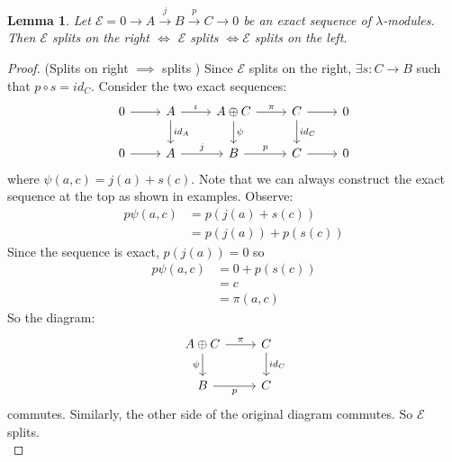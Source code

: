 \documentclass[12pt]{book}
\newtheorem{lemma}[theorem]{Lemma}
\theoremstyle{definition}
\begin{document}
\begin{lemma}
    Let $\mathcal{E} = 0 \rightarrow A \xrightarrow{j} B \xrightarrow{p} C \rightarrow 0$ be an exact sequence of $\lambda$-modules. Then $\mathcal{E}$ splits on the right $\iff$ $\mathcal{E}$ splits $\iff \mathcal{E}$ splits on the left. 
\end{lemma}
\begin{proof}
    (Splits on right $\implies$ splits )
    Since $\mathcal{E}$ splits on the right, $\exists s : C \rightarrow B$ such that $p \circ s = id_C$. Consider the two exact sequences:
        \[
        \begin{tikzcd}
        0 \arrow[r] & A \arrow[r, "\iota"] \arrow[d, "id_A"] 
        & A \oplus C \arrow[r, "\pi"] \arrow[d, "\psi"]
        & C \arrow[r] \arrow[d, "id_C"]
        & 0 \\
        0 \arrow[r] & A \arrow[r, "j"]  
        & B \arrow[r, "p"] 
        & C \arrow[r] 
        & 0 
        \end{tikzcd}
        \]
    where $\psi(a,c) = j(a) + s(c)$. Note that we can always construct the exact sequence at the top as shown in examples. Observe: 
    \begin{align*}
        p \psi(a,c) &= p(j(a) + s(c))\\
                    &= p(j(a)) + p(s(c))
    \end{align*}
    Since the sequence is exact, $p(j(a)) = 0$ so 
    \begin{align*}
        p \psi(a,c) &= 0 + p(s(c))\\
                    &= c \\
                    &= \pi(a,c)
    \end{align*}
    So the diagram: 
        \[
        \begin{tikzcd}
        A \oplus C \arrow[r, "\pi"] \arrow[d, "\psi"'] 
        & C \arrow[d, "id_C"] \\
        B \arrow[r, "p"'] 
        & C
        \end{tikzcd}
        \]
    commutes. Similarly, the other side of the original diagram commutes. So $\mathcal{E}$ splits.\\


\end{proof}
\end{document}
